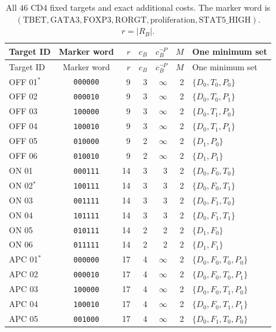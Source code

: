 \begin{longtable}{@{}lcrrrrl@{}}
\caption{All $46$ CD4 fixed targets and exact additional costs. The marker
word is $(\mathrm{TBET},\mathrm{GATA3},\mathrm{FOXP3},\mathrm{RORGT},
\mathrm{proliferation},\mathrm{STAT5\_HIGH})$. $r=|R_B|$.}
\label{tab:allcd4targets}\\
\toprule Target ID & Marker word & $r$ & $c_B$ & $c_B^{\neg P}$ & $M$ & One minimum set\\\midrule\endfirsthead
\toprule Target ID & Marker word & $r$ & $c_B$ & $c_B^{\neg P}$ & $M$ & One minimum set\\\midrule\endhead
\bottomrule\endfoot
OFF 01$^*$ & \texttt{000000} & 9 & 3 & $\infty$ & 2 & $\{D_{0},T_{0},P_{0}\}$\\
OFF 02 & \texttt{000010} & 9 & 3 & $\infty$ & 2 & $\{D_{0},T_{0},P_{1}\}$\\
OFF 03 & \texttt{100000} & 9 & 3 & $\infty$ & 2 & $\{D_{0},T_{1},P_{0}\}$\\
OFF 04 & \texttt{100010} & 9 & 3 & $\infty$ & 2 & $\{D_{0},T_{1},P_{1}\}$\\
OFF 05 & \texttt{010000} & 9 & 2 & $\infty$ & 2 & $\{D_{1},P_{0}\}$\\
OFF 06 & \texttt{010010} & 9 & 2 & $\infty$ & 2 & $\{D_{1},P_{1}\}$\\
ON 01 & \texttt{000111} & 14 & 3 & 3 & 2 & $\{D_{0},F_{0},T_{0}\}$\\
ON 02$^*$ & \texttt{100111} & 14 & 3 & 3 & 2 & $\{D_{0},F_{0},T_{1}\}$\\
ON 03 & \texttt{001111} & 14 & 3 & 3 & 2 & $\{D_{0},F_{1},T_{0}\}$\\
ON 04 & \texttt{101111} & 14 & 3 & 3 & 2 & $\{D_{0},F_{1},T_{1}\}$\\
ON 05 & \texttt{010111} & 14 & 2 & 2 & 2 & $\{D_{1},F_{0}\}$\\
ON 06 & \texttt{011111} & 14 & 2 & 2 & 2 & $\{D_{1},F_{1}\}$\\
APC 01$^*$ & \texttt{000000} & 17 & 4 & $\infty$ & 2 & $\{D_{0},F_{0},T_{0},P_{0}\}$\\
APC 02 & \texttt{000010} & 17 & 4 & $\infty$ & 2 & $\{D_{0},F_{0},T_{0},P_{1}\}$\\
APC 03 & \texttt{100000} & 17 & 4 & $\infty$ & 2 & $\{D_{0},F_{0},T_{1},P_{0}\}$\\
APC 04 & \texttt{100010} & 17 & 4 & $\infty$ & 2 & $\{D_{0},F_{0},T_{1},P_{1}\}$\\
APC 05 & \texttt{001000} & 17 & 4 & $\infty$ & 2 & $\{D_{0},F_{1},T_{0},P_{0}\}$\\

\end{longtable}
